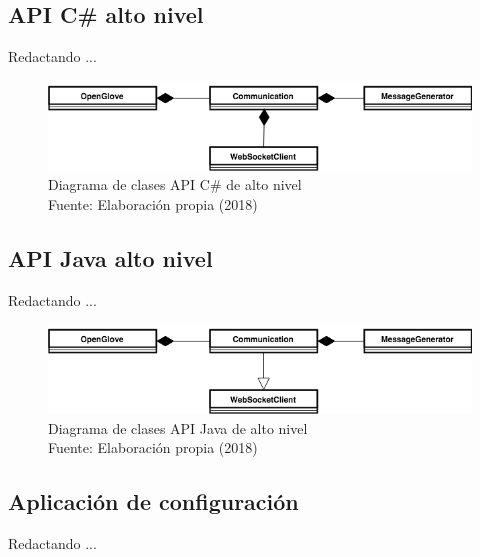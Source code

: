 \subsection{API C\# alto nivel}
Redactando ...

\begin{figure}[H]
  \begin{center} 
   	\includegraphics[width=1.0\textwidth]{images/chapter04/OpenGlove-Architecture-API-CSharp-HL.png} 
    \caption[Diagrama de clases API C\# de alto nivel]{Diagrama de clases API C\# de alto nivel \\Fuente: Elaboración propia (2018)}
    \label{fig:api-csharp-hl}
  \end{center}
\end{figure}




\subsection{API Java alto nivel}
Redactando ...

\begin{figure}[H]
  \begin{center} 
   	\includegraphics[width=1.0\textwidth]{images/chapter04/OpenGlove-Architecture-API-Java-HL.png} 
    \caption[Diagrama de clases API Java de alto nivel]{Diagrama de clases API Java de alto nivel \\Fuente: Elaboración propia (2018)}
    \label{fig:api-java-hl}
  \end{center}
\end{figure}




\subsection{Aplicación de configuración}
Redactando ... 


